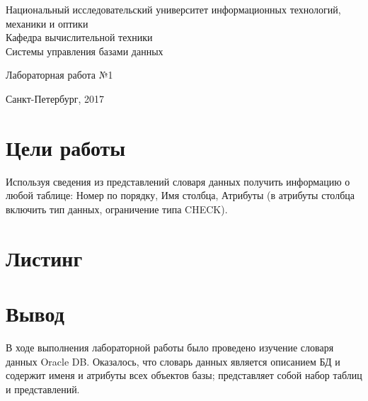 \documentclass[12pt, a4paper] {ncc}
\begin{document}
\frenchspacing
\pagestyle{empty}
\begin{center}
     Национальный исследовательский университет информационных технологий,
                              механики и оптики\\
                        Кафедра вычислительной техники\\
					Системы управления базами данных
\end{center}
\begin{center}
                            Лабораторная работа №1\\
\end{center}
\begin{center}
                             Санкт-Петербург, 2017
\end{center}
\newpage


\section{Цели работы}
    Используя сведения из представлений словаря данных получить информацию о любой таблице: 
	Номер по порядку, Имя столбца, Атрибуты (в атрибуты столбца включить тип данных, ограничение типа CHECK).

\section{Листинг}
	


\section*{Вывод}

В ходе выполнения лабораторной работы было проведено изучение словаря данных Oracle DB. Оказалось, что
словарь данных является описанием БД и содержит именя и атрибуты всех объектов базы; представляет собой
набор таблиц и представлений. 
\end{document}
